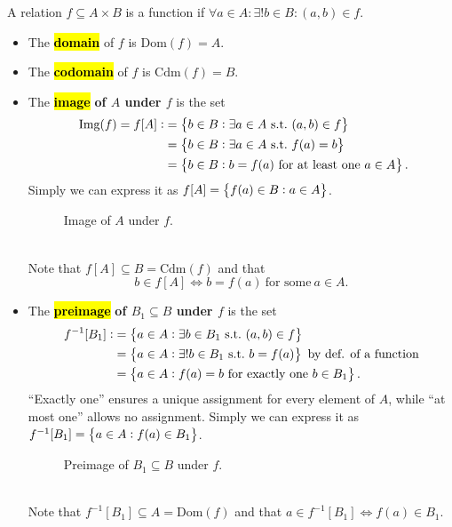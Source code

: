\documentclass[11pt,openany]{article}
\begin{document}
\begin{remark*}
	A relation $f\subseteq A\times B$ is a function if $\boxed{\forall a\in A:\exists! b\in B:(a,b)\in f.}$
	\begin{itemize}
		\item The \hl{\textbf{domain}} of $f$ is $\text{Dom}(f)=A$.
		\item The \hl{\textbf{codomain}} of $f$ is $\text{Cdm}(f)=B$.
		\item The \hl{\textbf{image}} \textbf{of $A$ under $f$} is the set \begin{align*}\
			\img{f}=f[A]:&=\set{b\in B:\exists a \in A\ \text{s.t.}\ (a,b)\in f}\\
			&=\set{b\in B:\exists a \in A\ \text{s.t.}\ f(a)=b}\\
			&=\set{b\in B: b = f(a)\ \text{for at least one}\ a\in A}.
		\end{align*} Simply we can express it as $f[A]=\set{f(a)\in B:a\in A}$. 
		\begin{figure}[h!]\centering
			
			\caption{Image of $A$ under $f$.}
		\end{figure}\\
		Note that $f[A]\subseteq B=\text{Cdm}(f)$ and that $$
			b\in f[A]\iff b=f(a)\ \text{for some}\ a\in A.$$	\newpage
		\item The \hl{\textbf{preimage}} \textbf{of $B_1\subseteq B$ under $f$} is the set \begin{align*}
			f^{-1}[B_1]:&=\set{a\in A:\exists b \in B_1\ \text{s.t.}\ (a,b)\in f}\\
			&=\set{a\in A:\exists! b \in B_1\ \text{s.t.}\ b=f(a)}\ \text{by def. of a function}\\
			&=\set{a\in A:f(a)=b\ \text{for exactly one}\ b\in B_1}.
		\end{align*} ``Exactly one'' ensures a unique assignment for every element of $A$, while ``at most one'' allows no assignment. Simply we can express it as $f^{-1}[B_1]=\set{a\in A:f(a)\in B_1}$.
		\begin{figure}[h!]\centering
				
				\caption{Preimage of $B_1\subseteq B$ under $f$.}
			\end{figure}\\
		Note that $f^{-1}[B_1]\subseteq A=\text{Dom}(f)$ and that $a\in f^{-1}[B_1]\iff f(a)\in B_1.$
	\end{itemize}
\end{remark*}
\end{document}
